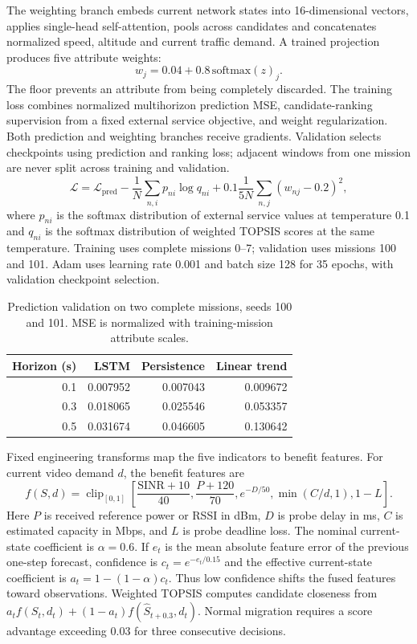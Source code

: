 \documentclass[preprint,12pt]{elsarticle}
\begin{document}
The weighting branch embeds current network states into 16-dimensional vectors, applies single-head self-attention, pools across candidates and concatenates normalized speed, altitude and current traffic demand. A trained projection produces five attribute weights:
\begin{equation}w_j=0.04+0.8\,\mathrm{softmax}(z)_j.\end{equation}
The floor prevents an attribute from being completely discarded. The training loss combines normalized multihorizon prediction MSE, candidate-ranking supervision from a fixed external service objective, and weight regularization. Both prediction and weighting branches receive gradients. Validation selects checkpoints using prediction and ranking loss; adjacent windows from one mission are never split across training and validation.
\begin{equation}
\mathcal L=\mathcal L_{\mathrm{pred}}-\frac1N\sum_{n,i}p_{ni}\log q_{ni}
+0.1\frac1{5N}\sum_{n,j}(w_{nj}-0.2)^2,
\end{equation}
where $p_{ni}$ is the softmax distribution of external service values at temperature 0.1 and $q_{ni}$ is the softmax distribution of weighted TOPSIS scores at the same temperature. Training uses complete missions 0--7; validation uses missions 100 and 101. Adam uses learning rate 0.001 and batch size 128 for 35 epochs, with validation checkpoint selection.
\begin{table}[ht]\centering\small
\caption{Prediction validation on two complete missions, seeds 100 and 101. MSE is normalized with training-mission attribute scales.}
\label{tab:prediction}
\begin{tabular}{rrrr}\hline
Horizon (s) & LSTM & Persistence & Linear trend \\ \hline
0.1 & 0.007952 & 0.007043 & 0.009672 \\
0.3 & 0.018065 & 0.025546 & 0.053357 \\
0.5 & 0.031674 & 0.046605 & 0.130642 \\
\hline\end{tabular}\end{table}


Fixed engineering transforms map the five indicators to benefit features. For current video demand $d$, the benefit features are
\begin{equation}
f(S,d)=\operatorname{clip}_{[0,1]}\left[
\frac{\mathrm{SINR}+10}{40},\frac{P+120}{70},
e^{-D/50},\min(C/d,1),1-L\right].
\end{equation}
Here $P$ is received reference power or RSSI in dBm, $D$ is probe delay in ms, $C$ is estimated capacity in Mbps, and $L$ is probe deadline loss. The nominal current-state coefficient is $\alpha=0.6$. If $e_t$ is the mean absolute feature error of the previous one-step forecast, confidence is $c_t=e^{-e_t/0.15}$ and the effective current-state coefficient is $a_t=1-(1-\alpha)c_t$. Thus low confidence shifts the fused features toward observations. Weighted TOPSIS computes candidate closeness from $a_t f(S_t,d_t)+(1-a_t)f(\hat S_{t+0.3},d_t)$. Normal migration requires a score advantage exceeding 0.03 for three consecutive decisions.
\end{document}
